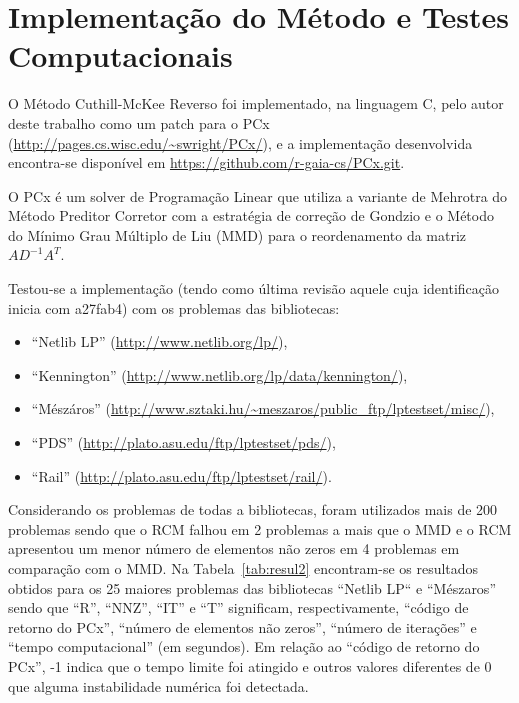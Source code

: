 \section{Implementação do Método e Testes Computacionais}
O Método Cuthill-McKee Reverso foi implementado, na linguagem C, pelo autor
deste trabalho como um patch para o PCx
(\url{http://pages.cs.wisc.edu/~swright/PCx/}), e a implementação desenvolvida
encontra-se disponível em \url{https://github.com/r-gaia-cs/PCx.git}.

O PCx é um solver de Programação Linear que utiliza a variante de Mehrotra do
Método Preditor Corretor com a estratégia de correção de Gondzio e o Método do
Mínimo Grau Múltiplo de Liu\cite{George:1981:ComputerSolutionPD} (MMD) para o
reordenamento da matriz $A D^{-1} A^T$.

Testou-se a implementação (tendo como última revisão aquele cuja identificação
inicia com a27fab4) com os problemas das bibliotecas:
\begin{itemize}
  \item ``Netlib LP'' (\url{http://www.netlib.org/lp/}),
  \item ``Kennington'' (\url{http://www.netlib.org/lp/data/kennington/}),
  \item ``Mészáros'' (\url{http://www.sztaki.hu/~meszaros/public_ftp/lptestset/misc/}),
  \item ``PDS'' (\url{http://plato.asu.edu/ftp/lptestset/pds/}),
  \item ``Rail'' (\url{http://plato.asu.edu/ftp/lptestset/rail/}).
\end{itemize}

Considerando os problemas de todas a bibliotecas, foram utilizados mais de 200
problemas sendo que o RCM falhou em 2 problemas a mais que o MMD e o RCM
apresentou um menor número de elementos não zeros em 4 problemas em comparação
com o MMD. Na Tabela~\ref{tab:resul2} encontram-se os resultados obtidos para
os 25 maiores problemas das bibliotecas ``Netlib LP`` e ``Mészaros'' sendo que
``R'', ``NNZ'', ``IT'' e ``T'' significam, respectivamente, ``código de retorno do
PCx'', ``número de elementos não zeros'', ``número de iterações'' e ``tempo
computacional'' (em segundos). Em relação ao ``código de retorno do PCx'', -1
indica que o tempo limite foi atingido e outros valores diferentes de 0 que
alguma instabilidade numérica foi detectada.
